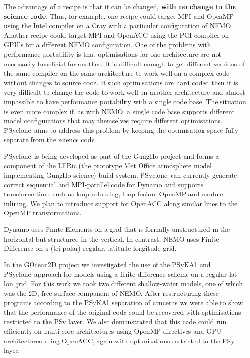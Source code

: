 \documentclass{article}
\newcommand{\psykal}{{PS}y{KA}l}
\newcommand{\psyclone}{{PS}yclone}
\begin{document}
The advantage of a recipe is that it can be changed, {\bf with no
  change to the science code}. Thus, for example, one recipe could
target MPI and OpenMP using the Intel compiler on a Cray with a
particular configuration of NEMO. Another recipe could target MPI and
OpenACC using the PGI compiler on GPU's for a different NEMO
configuration. One of the problems with performance portability is
that optimisations for one architecture are not necessarily beneficial
for another. It is difficult enough to get different versions of the
same compiler on the same architecture to work well on a complex code
without changes to source code. If such optimisations are hard coded
then it is very difficult to change the code to work well on another
architecture and almost impossible to have performance portability
with a single code base. The situation is even more complex if, as
with NEMO, a single code base supports different model configurations
that may themselves require different optimisations. \psyclone\ aims
to address this problem by keeping the optimisation space fully
separate from the science code.

\psyclone\ is being developed as part of the GungHo project
and forms a component of the LFRic (the prototype Met Office
atmosphere model implementing GungHo science) build
system. \psyclone\ can currently generate correct sequential and
MPI-parallel code for Dynamo and supports transformations such as loop
colouring, loop fusion, OpenMP and module inlining. We plan to
introduce support for OpenACC along similar lines to the OpenMP
transformations.

Dynamo uses Finite Elements on a grid that is formally
unstructured in the horizontal but structured in the vertical.  In
contrast, NEMO uses Finite Difference on a (tri-polar) regular,
latitude-longitude grid.

In the GOcean2D project we investigated the use of the \psykal\ and
\psyclone\ approach for models using a finite-difference scheme on a
regular lat-lon grid. For this work we took two different
shallow-water models, one of which was the 2D, free-surface component
of NEMO. After restructuring these programs according to the
\psykal\ separation of concerns we were able to show that the
performance of the original code could be recovered with optimisations
restricted to the PSy layer.\cite{psykal_shallow} We also demonstrated
that this code could run efficiently on multi-core architectures using
OpenMP directives and GPU architectures using OpenACC, again with
optimisations restricted to the PSy layer.
\end{document}

